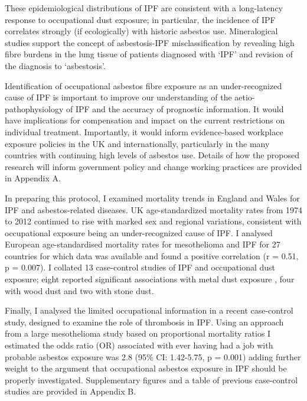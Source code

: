 \documentclass[a4paper,10pt]{article}
\begin{document}
These epidemiological distributions of IPF are consistent with a long-latency response to occupational dust exposure; in particular, the incidence of IPF correlates strongly (if ecologically) with historic asbestos use.\cite{Barber2015} Mineralogical studies support the concept of asbestosis-IPF misclassification by revealing high fibre burdens in the lung tissue of patients diagnosed with `IPF' and revision of the diagnosis to `asbestosis'.\cite{Monso1990}\cite{Monso1991}\cite{Glazer2009}\cite{Ghio20.5} 

Identification of occupational asbestos fibre exposure as an under-recognized cause of IPF is important to improve our understanding of the aetio-pathophysiology of IPF and the accuracy of prognostic information. It would have implications for compensation and impact on the current restrictions on individual treatment. Importantly, it would inform evidence-based workplace exposure policies in the UK and internationally, particularly in the many countries with continuing high levels of asbestos use. Details of how the proposed research will inform government policy and change working practices are provided in Appendix A.

In preparing this protocol, I examined mortality trends in England and Wales for IPF and asbestos-related diseases. UK age-standardized mortality rates from 1974 to 2012 continued to rise with marked sex and regional variations, consistent with occupational exposure being an under-recognized cause of IPF.\cite{Reynolds20.5} I analysed European age-standardised mortality rates for mesothelioma and IPF for 27 countries for which data was available and found a positive correlation (r = 0.51, p = 0.007). I collated 13 case-control studies of IPF and occupational dust exposure; eight reported significant associations with metal dust exposure \cite{Scott1990}\cite{Iwai1994}\cite{Hubbard1996}\cite{Hubbard2000}\cite{Miyake2005}\cite{Pinheiro2008}, four with wood dust \cite{Hubbard1996a}\cite{Gustafson2007}\cite{Pinheiro2008}\cite{Awadalla2012} and two with stone dust.\cite{Baumgartner2000}\cite{Mullen1998}

Finally, I analysed the limited occupational information in a recent case-control study, designed to examine the role of thrombosis in IPF.\cite{Navaratnam2011} Using an approach from a large mesothelioma study based on proportional mortality ratios\cite{Rake2009} I estimated the odds ratio (OR) associated with ever having had a job with probable asbestos exposure was 2.8 (95\% CI: 1.42-5.75, p = 0.001) adding further weight to the argument that occupational asbestos exposure in IPF should be properly investigated. Supplementary figures and a table of previous case-control studies are provided in Appendix B. 
\end{document}
